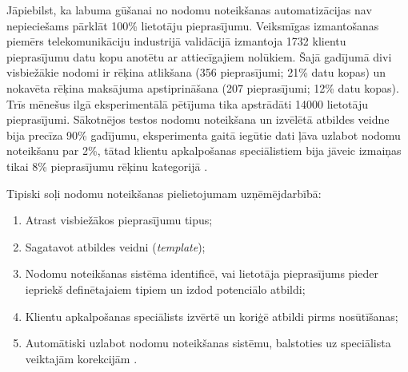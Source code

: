 Jāpiebilst, ka labuma gūšanai no nodomu noteikšanas automatizācijas nav nepieciešams pārklāt 100\% lietotāju pieprasījumu. Veiksmīgas izmantošanas piemērs telekomunikāciju industrijā validācijā izmantoja 1732 klientu pieprasījumu datu kopu anotētu ar attiecīgajiem nolūkiem. Šajā gadījumā divi visbiežākie nodomi ir rēķina atlikšana (356 pieprasījumi; 21\% datu kopas) un nokavēta rēķina maksājuma apstiprināšana (207 pieprasījumi; 12\% datu kopas). Trīs mēnešus ilgā eksperimentālā pētījuma tika apstrādāti 14000 lietotāju pieprasījumi. Sākotnējos testos nodomu noteikšana un izvēlētā atbildes veidne bija precīza 90\% gadījumu, eksperimenta gaitā iegūtie dati ļāva uzlabot nodomu noteikšanu par 2\%, tātad klientu apkalpošanas speciālistiem bija jāveic izmaiņas tikai 8\% pieprasījumu rēķinu kategorijā \cite{paikens2020}.

Tipiski soļi nodomu noteikšanas pielietojumam uzņēmējdarbībā:
\begin{enumerate}
	\item Atrast visbiežākos pieprasījumu tipus;
	\item Sagatavot atbildes veidni (\textit{template});
	\item Nodomu noteikšanas sistēma identificē, vai lietotāja pieprasījums pieder iepriekš definētajaiem tipiem un izdod potenciālo atbildi;
	\item Klientu apkalpošanas speciālists izvērtē un koriģē atbildi pirms nosūtīšanas;
	\item Automātiski uzlabot nodomu noteikšanas sistēmu, balstoties uz speciālista veiktajām korekcijām \cite{paikens2020}.
\end{enumerate}

